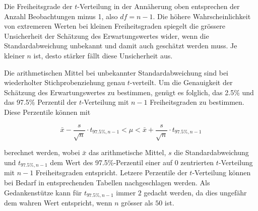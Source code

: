 \documentclass[
]{book}
\theoremstyle{definition}
\theoremstyle{definition}
\theoremstyle{definition}
\theoremstyle{definition}
\theoremstyle{remark}
\begin{document}
Die Freiheitsgrade der \(t\)-Verteilung in der Annäherung oben entsprechen der Anzahl Beobachtungen minus 1, also \(df = n-1\). Die höhere Wahrscheinlichkeit von extremeren Werten bei kleinen Freiheitsgraden spiegelt die grössere Unsicherheit der Schätzung des Erwartungswertes wider, wenn die Standardabweichung unbekannt und damit auch geschätzt werden muss. Je kleiner \(n\) ist, desto stärker fällt diese Unsicherheit aus.

Die arithmetischen Mittel bei unbekannter Standardabweichung sind bei wiederholter Stichprobenziehung genau \(t\)-verteilt. Um die Genauigkeit der Schätzung des Erwartungswertes zu bestimmen, genügt es folglich, das 2.5\% und das 97.5\% Perzentil der \(t\)-Verteilung mit \(n-1\) Freiheitsgraden zu bestimmen. Diese Perzentile können mit

\begin{equation}
\bar{x} - \frac{s}{\sqrt{n}} \cdot t_{97.5\%, n-1} < \mu < \bar{x} + \frac{s}{\sqrt{n}} \cdot t_{97.5\%, n-1}\label{eq:ki-mean}
\end{equation}

berechnet werden, wobei \(\bar{x}\) das arithmetische Mittel, \(s\) die Standardabweichung und \(t_{97.5\%, n-1}\) dem Wert des 97.5\%-Perzentil einer auf 0 zentrierten \(t\)-Verteilung mit \(n-1\) Freiheitsgraden entspricht. Letzere Perzentile der \(t\)-Verteilung können bei Bedarf in entsprechenden Tabellen nachgeschlagen werden. Als Gedankenstütze kann für \(t_{97.5\%, n-1}\) immer \(2\) gedacht werden, da dies ungefähr dem wahren Wert entspricht, wenn \(n\) grösser als \(50\) ist.
\end{document}
